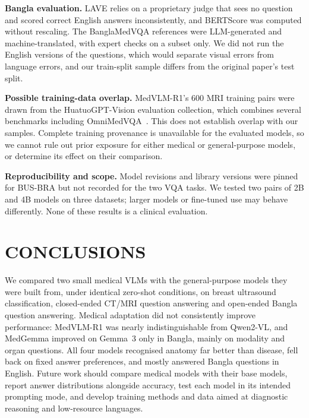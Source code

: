 \documentclass[doublecolumn]{ijcvsplatex}
\newcommand{\qwen}{Qwen2-VL}
\newcommand{\medvlm}{MedVLM-R1}
\newcommand{\gemma}{Gemma~3}
\newcommand{\medgemma}{MedGemma}
\begin{document}
\textbf{Bangla evaluation.} LAVE relies on a proprietary judge that sees no question and scored correct English answers inconsistently, and BERTScore was computed without rescaling. The BanglaMedVQA references were LLM-generated and machine-translated, with expert checks on a subset only. We did not run the English versions of the questions, which would separate visual errors from language errors, and our train-split sample differs from the original paper's test split.

\textbf{Possible training-data overlap.} \medvlm{}'s 600 MRI training pairs were drawn from the HuatuoGPT-Vision evaluation collection, which combines several benchmarks including OmniMedVQA~\cite{pan2025medvlmr1}. This does not establish overlap with our samples. Complete training provenance is unavailable for the evaluated models, so we cannot rule out prior exposure for either medical or general-purpose models, or determine its effect on their comparison.

\textbf{Reproducibility and scope.} Model revisions and library versions were pinned for BUS-BRA but not recorded for the two VQA tasks. We tested two pairs of 2B and 4B models on three datasets; larger models or fine-tuned use may behave differently. None of these results is a clinical evaluation.

\section{CONCLUSIONS}
\label{sec_conclusion}

We compared two small medical VLMs with the general-purpose models they were built from, under identical zero-shot conditions, on breast ultrasound classification, closed-ended CT/MRI question answering and open-ended Bangla question answering. Medical adaptation did not consistently improve performance: \medvlm{} was nearly indistinguishable from \qwen{}, and \medgemma{} improved on \gemma{} only in Bangla, mainly on modality and organ questions. All four models recognised anatomy far better than disease, fell back on fixed answer preferences, and mostly answered Bangla questions in English. Future work should compare medical models with their base models, report answer distributions alongside accuracy, test each model in its intended prompting mode, and develop training methods and data aimed at diagnostic reasoning and low-resource languages.




\end{document}
